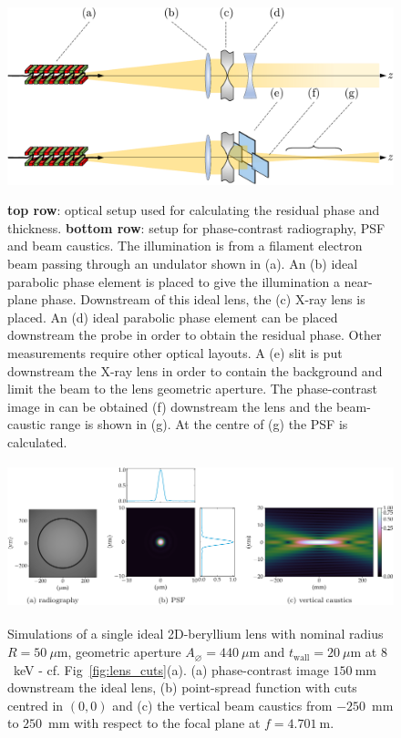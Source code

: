 \begin{refsection}
\begin{figure}[t]
    \centering
    {\includegraphics[width=.7\linewidth]{figures/ch04/simulations.pdf}}
    \caption[Optical layout used for modelling imperfections in CRL]{\textbf{top row}: optical setup used for calculating the residual phase and thickness. \textbf{bottom row}: setup for phase-contrast radiography, PSF and beam caustics. The illumination is from a filament electron beam passing through an undulator shown in (a). An (b) ideal parabolic phase element is placed to give the illumination a near-plane phase. Downstream of this ideal lens, the (c) X-ray lens is placed. An (d) ideal parabolic phase element can be placed downstream the probe in order to obtain the residual phase. Other measurements require other optical layouts. A (e) slit is put downstream the X-ray lens in order to contain the background and limit the beam to the lens geometric aperture. The phase-contrast image in can be obtained (f) downstream the lens and the beam-caustic range is shown in (g). At the centre of (g) the PSF is calculated.}
    \label{fig:optical_layouts}
\end{figure}
 \begin{figure}[t]
        \centering
        {\includegraphics[height=4.19cm]{figures/ch04/CRL_ideal.pdf}}
        \caption[The ideal single X-ray lens]{Simulations of a single ideal 2D-beryllium lens with nominal radius $R=50~\mu\text{m}$, geometric aperture $A_{\diameter}=440~\mu\text{m}$ and $t_\text{wall}=20~\mu$m at $8$~keV  - cf. Fig~\ref{fig:lens_cuts}(a). (a) phase-contrast image $150~$mm downstream the ideal lens, (b) point-spread function with cuts centred in $(0,0)$ and (c) the vertical beam caustics from $-250$~mm to $250$~mm with respect to the focal plane at $f=4.701~$m.} \label{fig:ideal_CRL}
\end{figure}


\end{refsection}
